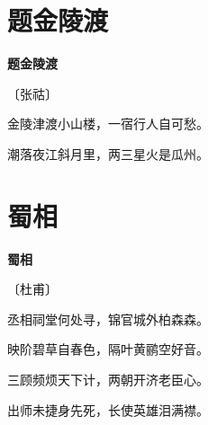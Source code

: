 \documentclass[12pt,UTF-8,openany,fontset=none]{ctexbook}
\begin{document}
\section{题金陵渡}


\begin{center}
    {\bfseries 题金陵渡}

    \vspace{18pt}

    \begin{large}\xuwen
        〔张祜〕
    \end{large}

\end{center}

    \vspace{18pt}

\begin{center}
    \begin{Large}

        金陵津渡小山楼，一宿行人自可愁。

        潮落夜江斜月里，两三星火是瓜州。

    \end{Large}

\end{center}

\vspace{8pt}
\clearpage

\section{蜀相}


\begin{center}
    {\bfseries 蜀相}

    \vspace{18pt}

    \begin{large}\xuwen
        〔杜甫〕
    \end{large}

\end{center}

    \vspace{18pt}  %

\begin{center}
    \begin{Large}

        丞相祠堂何处寻，锦官城外柏森森。

        映阶碧草自春色，隔叶黄鹂空好音。

        三顾频烦天下计，两朝开济老臣心。

        出师未捷身先死，长使英雄泪满襟。

    \end{Large}

\end{center}
\end{document}
